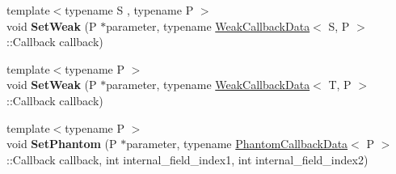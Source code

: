 \begin{DoxyCompactItemize}
\item 
\hypertarget{classv8_1_1_persistent_base_a26cacb456e6a02bb8214dfd8a31247c9}{}{\footnotesize template$<$typename S , typename P $>$ }\\void {\bfseries Set\+Weak} (P $\ast$parameter, typename \hyperlink{classv8_1_1_weak_callback_data}{Weak\+Callback\+Data}$<$ S, P $>$\+::Callback callback)\label{classv8_1_1_persistent_base_a26cacb456e6a02bb8214dfd8a31247c9}

\item 
\hypertarget{classv8_1_1_persistent_base_aaf342ece1a4ba926ba62e8d6af7be777}{}{\footnotesize template$<$typename P $>$ }\\void {\bfseries Set\+Weak} (P $\ast$parameter, typename \hyperlink{classv8_1_1_weak_callback_data}{Weak\+Callback\+Data}$<$ T, P $>$\+::Callback callback)\label{classv8_1_1_persistent_base_aaf342ece1a4ba926ba62e8d6af7be777}

\item 
\hypertarget{classv8_1_1_persistent_base_a1ce2741c1b39f84d9e2fe2631ca094b6}{}{\footnotesize template$<$typename P $>$ }\\void {\bfseries Set\+Phantom} (P $\ast$parameter, typename \hyperlink{classv8_1_1_phantom_callback_data}{Phantom\+Callback\+Data}$<$ P $>$\+::Callback callback, int internal\+\_\+field\+\_\+index1, int internal\+\_\+field\+\_\+index2)\label{classv8_1_1_persistent_base_a1ce2741c1b39f84d9e2fe2631ca094b6}

\end{DoxyCompactItemize}
